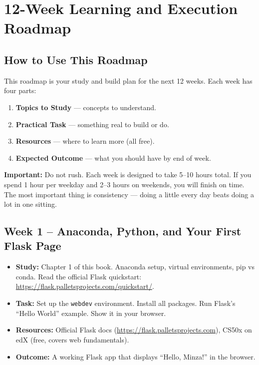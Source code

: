 \documentclass[12pt, a4paper]{book}
\begin{document}
\chapter{12-Week Learning and Execution Roadmap}

\section{How to Use This Roadmap}

This roadmap is your study and build plan for the next 12 weeks.
Each week has four parts:
\begin{enumerate}[leftmargin=1.5em]
  \item \textbf{Topics to Study} --- concepts to understand.
  \item \textbf{Practical Task} --- something real to build or do.
  \item \textbf{Resources} --- where to learn more (all free).
  \item \textbf{Expected Outcome} --- what you should have by end of week.
\end{enumerate}

\begin{tcolorbox}[warnbox]
\textbf{Important:} Do not rush. Each week is designed to take 5--10 hours total.
If you spend 1 hour per weekday and 2--3 hours on weekends, you will finish on time.
The most important thing is consistency --- doing a little every day
beats doing a lot in one sitting.
\end{tcolorbox}


\section{Week 1 -- Anaconda, Python, and Your First Flask Page}
\begin{itemize}[leftmargin=1.5em]
  \item \textbf{Study:} Chapter 1 of this book. Anaconda setup, virtual environments,
        pip vs conda. Read the official Flask quickstart: \url{https://flask.palletsprojects.com/quickstart/}.
  \item \textbf{Task:} Set up the \texttt{webdev} environment. Install all packages.
        Run Flask's ``Hello World'' example. Show it in your browser.
  \item \textbf{Resources:} Official Flask docs (\url{https://flask.palletsprojects.com}),
        CS50x on edX (free, covers web fundamentals).
  \item \textbf{Outcome:} A working Flask app that displays ``Hello, Minza!'' in the browser.
\end{itemize}
\end{document}

